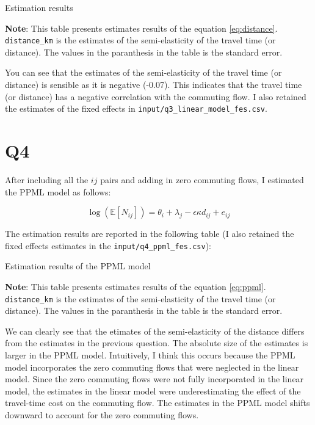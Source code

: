 \documentclass[
  11pt]{article}
\begin{document}
\begin{table}[!ht]
\centering
\caption{Estimation results}
\label{tab:est_results}

\end{table}

\footnotesize \textbf{Note}: This table presents estimates results of
the equation \ref{eq:distance}. \texttt{distance\_km} is the estimates
of the semi-elasticity of the travel time (or distance). The values in
the paranthesis in the table is the standard error.\vspace{3em}

\normalsize

You can see that the estimates of the semi-elasticity of the travel time
(or distance) is sensible as it is negative (-0.07). This indicates that
the travel time (or distance) has a negative correlation with the
commuting flow. I also retained the estimates of the fixed effects in
\texttt{input/q3\_linear\_model\_fes.csv}.

\section*{Q4}\label{q4}

After including all the \(ij\) pairs and adding in zero commuting flows,
I estimated the PPML model as follows:

\[
\log(\mathbb{E}[N_{ij}])= \theta_{i} + \lambda_{j} - \epsilon \kappa d_{ij} + e_{ij}\label{eq:ppml}
\]

The estimation results are reported in the following table (I also
retained the fixed effects estimates in the
\texttt{input/q4\_ppml\_fes.csv}):

\begin{table}[!ht]
\centering
\caption{Estimation results of the PPML model}
\label{tab:est_ppml}

\end{table}

\footnotesize \textbf{Note}: This table presents estimates results of
the equation \ref{eq:ppml}. \texttt{distance\_km} is the estimates of
the semi-elasticity of the travel time (or distance). The values in the
paranthesis in the table is the standard error.\vspace{3em}

\normalsize

We can clearly see that the etimates of the semi-elasticity of the
distance differs from the estimates in the previous question. The
absolute size of the estimates is larger in the PPML model. Intuitively,
I think this occurs because the PPML model incorporates the zero
commuting flows that were neglected in the linear model. Since the zero
commuting flows were not fully incorporated in the linear model, the
estimates in the linear model were underestimating the effect of the
travel-time cost on the commuting flow. The estimates in the PPML model
shifts downward to account for the zero commuting flows.
\end{document}
